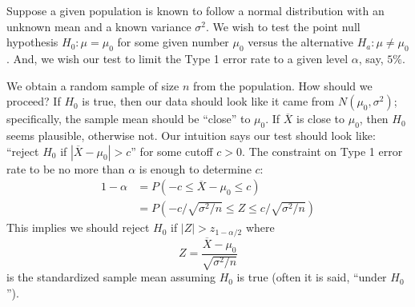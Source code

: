 \documentclass[
]{book}
\begin{document}
Suppose a given population is known to follow a normal distribution with an unknown mean and a known variance \(\sigma^2\). We wish to test the point null hypothesis \(H_0:\mu = \mu_0\) for some given number \(\mu_0\) versus the alternative \(H_a:\mu \ne \mu_0\). And, we wish our test to limit the Type 1 error rate to a given level \(\alpha\), say, \(5\%\).

We obtain a random sample of size \(n\) from the population. How should we proceed? If \(H_0\) is true, then our data should look like it came from \(N(\mu_0, \sigma^2)\); specifically, the sample mean should be ``close'' to \(\mu_0\). If \(\overline X\) is close to \(\mu_0\), then \(H_0\) seems plausible, otherwise not. Our intuition says our test should look like: ``reject \(H_0\) if \(|\overline X-\mu_0|>c\)'' for some cutoff \(c>0\). The constraint on Type 1 error rate to be no more than \(\alpha\) is enough to determine \(c\):
\begin{align*}
1-\alpha &= P(-c\leq \overline X - \mu_0 \leq c)\\
& = P(-c/\sqrt{\sigma^2/n} \leq Z \leq c/\sqrt{\sigma^2/n})
\end{align*}
This implies we should reject \(H_0\) if \(|Z|>z_{1-\alpha/2}\) where
\[Z = \frac{\overline X - \mu_0}{\sqrt{\sigma^2/n}}\]
is the standardized sample mean assuming \(H_0\) is true (often it is said, ``under \(H_0\)'').
\end{document}
